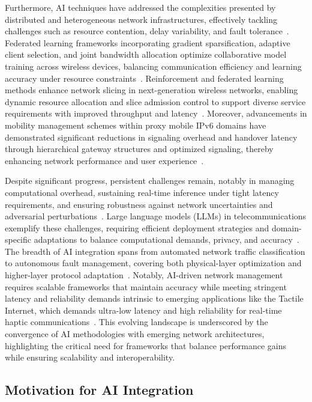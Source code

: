 \documentclass[sigconf]{acmart}
\begin{document}
Furthermore, AI techniques have addressed the complexities presented by distributed and heterogeneous network infrastructures, effectively tackling challenges such as resource contention, delay variability, and fault tolerance~\cite{ref4,ref5,ref6}. Federated learning frameworks incorporating gradient sparsification, adaptive client selection, and joint bandwidth allocation optimize collaborative model training across wireless devices, balancing communication efficiency and learning accuracy under resource constraints~\cite{ref4,ref5}. Reinforcement and federated learning methods enhance network slicing in next-generation wireless networks, enabling dynamic resource allocation and slice admission control to support diverse service requirements with improved throughput and latency~\cite{ref6}. Moreover, advancements in mobility management schemes within proxy mobile IPv6 domains have demonstrated significant reductions in signaling overhead and handover latency through hierarchical gateway structures and optimized signaling, thereby enhancing network performance and user experience~\cite{ref19}.

Despite significant progress, persistent challenges remain, notably in managing computational overhead, sustaining real-time inference under tight latency requirements, and ensuring robustness against network uncertainties and adversarial perturbations~\cite{ref7,ref8,ref9}. Large language models (LLMs) in telecommunications exemplify these challenges, requiring efficient deployment strategies and domain-specific adaptations to balance computational demands, privacy, and accuracy~\cite{ref7}. The breadth of AI integration spans from automated network traffic classification to autonomous fault management, covering both physical-layer optimization and higher-layer protocol adaptation~\cite{ref10,ref49,ref50}. Notably, AI-driven network management requires scalable frameworks that maintain accuracy while meeting stringent latency and reliability demands intrinsic to emerging applications like the Tactile Internet, which demands ultra-low latency and high reliability for real-time haptic communications~\cite{ref10}. This evolving landscape is underscored by the convergence of AI methodologies with emerging network architectures, highlighting the critical need for frameworks that balance performance gains while ensuring scalability and interoperability.

\subsection{Motivation for AI Integration}
\end{document}
